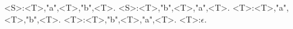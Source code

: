 <S>:<T>,"a",<T>,"b",<T>.
<S>:<T>,"b",<T>,"a",<T>.
<T>:<T>,"a",<T>,"b",<T>.
<T>:<T>,"b",<T>,"a",<T>.
<T>:$\epsilon$.
